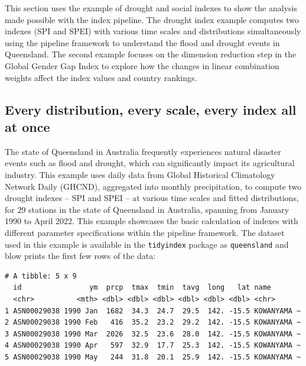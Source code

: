 \documentclass[
]{interact}
\begin{document}
This section uses the example of drought and social indexes to show the
analysis made possible with the index pipeline. The drought index
example computes two indexes (SPI and SPEI) with various time scales and
distributions simultaneously using the pipeline framework to understand
the flood and drought events in Queensland. The second example focuses
on the dimension reduction step in the Global Gender Gap Index to
explore how the changes in linear combination weights affect the index
values and country rankings.

\hypertarget{every-distribution-every-scale-every-index-all-at-once}{%
\subsection{Every distribution, every scale, every index all at
once}\label{every-distribution-every-scale-every-index-all-at-once}}

The state of Queensland in Australia frequently experiences natural
disaster events such as flood and drought, which can significantly
impact its agricultural industry. This example uses daily data from
Global Historical Climatology Network Daily (GHCND), aggregated into
monthly precipitation, to compute two drought indexes -- SPI and SPEI --
at various time scales and fitted distributions, for 29 stations in the
state of Queensland in Australia, spanning from January 1990 to April
2022. This example showcases the basic calculation of indexes with
different parameter specifications within the pipeline framework. The
dataset used in this example is available in the \texttt{tidyindex}
package as \texttt{queensland} and blow prints the first few rows of the
data:

\begin{verbatim}
# A tibble: 5 x 9
  id                ym  prcp  tmax  tmin  tavg  long   lat name       
  <chr>          <mth> <dbl> <dbl> <dbl> <dbl> <dbl> <dbl> <chr>      
1 ASN00029038 1990 Jan  1682  34.3  24.7  29.5  142. -15.5 KOWANYAMA ~
2 ASN00029038 1990 Feb   416  35.2  23.2  29.2  142. -15.5 KOWANYAMA ~
3 ASN00029038 1990 Mar  2026  32.5  23.6  28.0  142. -15.5 KOWANYAMA ~
4 ASN00029038 1990 Apr   597  32.9  17.7  25.3  142. -15.5 KOWANYAMA ~
5 ASN00029038 1990 May   244  31.8  20.1  25.9  142. -15.5 KOWANYAMA ~
\end{verbatim}
\end{document}
